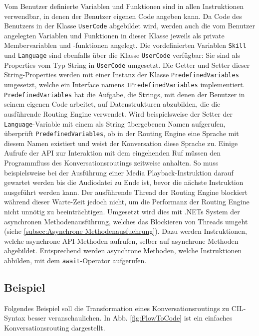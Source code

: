 Vom Benutzer definierte Variablen und Funktionen sind in allen Instruktionen verwendbar, in denen der Benutzer eigenen Code angeben kann. Da Code des Benutzers in der Klasse \texttt{UserCode} abgebildet wird, werden auch die vom Benutzer angelegten Variablen und Funktionen in dieser Klasse jeweils als private Membervariablen und -funktionen angelegt. Die vordefinierten Variablen \texttt{Skill} und \texttt{Language} sind ebenfalls über die Klasse \texttt{UserCode} verfügbar: Sie sind als Properties vom Typ String in \texttt{UserCode} umgesetzt. Die Getter und Setter dieser String-Properties werden mit einer Instanz der Klasse \texttt{PredefinedVariables} umgesetzt, welche ein Interface namens \texttt{IPredefinedVariables} implementiert. \texttt{PredefinedVariables} hat die Aufgabe, die Strings, mit denen der Benutzer in seinem eigenen Code arbeitet, auf Datenstrukturen abzubilden, die die ausführende Routing Engine verwendet. Wird beispielsweise der Setter der \texttt{Language}-Variable mit einem als String übergebenen Namen aufgerufen, überprüft \texttt{PredefinedVariables}, ob in der Routing Engine eine Sprache mit diesem Namen existiert und weist der Konversation diese Sprache zu. 
\newline
Einige Aufrufe der API zur Interaktion mit dem eingehenden Ruf müssen den Programmfluss des Konversationsroutings zeitweise anhalten. So muss beispielsweise bei der Ausführung einer Media Playback-Instruktion darauf gewartet werden bis die Audiodatei zu Ende ist, bevor die nächste Instruktion ausgeführt werden kann. Der ausführende Thread der Routing Engine blockiert während dieser Warte-Zeit jedoch nicht, um die Performanz der Routing Engine nicht unnötig zu beeinträchtigen. Umgesetzt wird dies mit .NETs System der asynchronen Methodenausführung, welches das Blockieren von Threads umgeht (siehe \ref{subsec:Asynchrone Methodenausfuehrung}). Dazu werden Instruktionen, welche asynchrone API-Methoden aufrufen, selber auf asynchrone Methoden abgebildet. Entsprechend werden asynchrone Methoden, welche Instruktionen abbilden, mit dem \texttt{await}-Operator aufgerufen.

\subsection{Beispiel}
\label{subsec:Beispiel}
Folgendes Beispiel soll die Transformation eines Konversationsroutings zu CIL-Syntax besser veranschaulichen. In Abb. \ref{fig:FlowToCode} ist ein einfaches Konversationsrouting dargestellt. 

